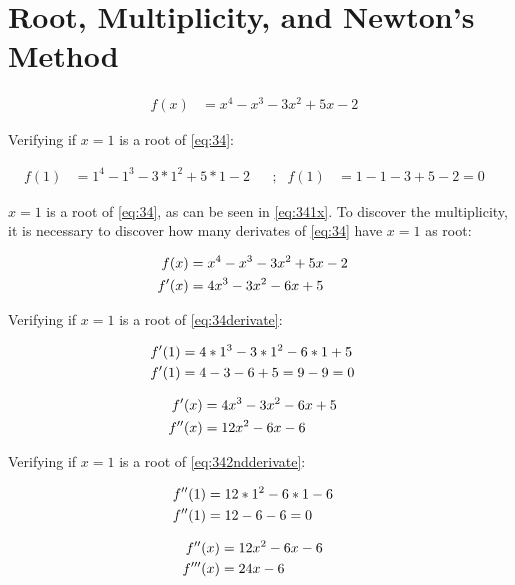 \section{Root, Multiplicity, and Newton's Method}
	
	\begin{align}
		f(x) &= x^{4} - x^{3} - 3x^{2} + 5x - 2&
	\label{eq:34}
	\end{align}

	Verifying if $x=1$ is a root of \cref{eq:34}:

	\begin{align}
		f(1) &= 1^{4} - 1^{3} - 3*1^{2} + 5*1 - 2& &;&
		f(1) &= 1 - 1 - 3 + 5 - 2 = 0& 
	\label{eq:341x}
	\end{align}

	$x=1$ is a root of \cref{eq:34}, as can be seen in \cref{eq:341x}. To discover the multiplicity, it is necessary to discover how many derivates of \cref{eq:34} have $x=1$ as root:

	\begin{align}
		f(x) &= x^{4} - x^{3} - 3x^{2} + 5x - 2& \notag \\
		f'(x) &= 4x^{3} - 3x^{2} - 6x + 5&
	\label{eq:34derivate}
	\end{align}

	Verifying if $x=1$ is a root of \cref{eq:34derivate}:

	\begin{align}
		f'(1) &= 4*1^{3} - 3*1^{2} - 6*1 + 5& \notag \\
		f'(1) &= 4 - 3 - 6 + 5 = 9 - 9 = 0 &
	\label{eq:34derivate1x}
	\end{align}

	\begin{align}
		f'(x) &= 4x^{3} - 3x^{2} - 6x + 5& \notag \\
		f''(x) &= 12x^{2} - 6x - 6&
	\label{eq:342ndderivate}
	\end{align}

	Verifying if $x=1$ is a root of \cref{eq:342ndderivate}:

	\begin{align}
		f''(1) &= 12*1^{2} - 6*1 - 6& \notag \\
		f''(1) &= 12 - 6 - 6 = 0& \notag \\
	\label{eq:332ndderivate1x}
	\end{align}

	\begin{align}
		f''(x) &= 12x^{2} - 6x - 6& \notag \\
		f'''(x) &= 24x - 6&
	\label{eq:343rdderivate}
	\end{align}

